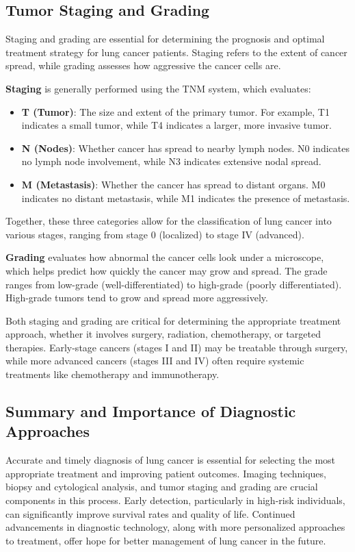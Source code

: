 \subsection{Tumor Staging and Grading}

Staging and grading are essential for determining the prognosis and optimal treatment strategy for 
lung cancer patients. Staging refers to the extent of cancer spread, while grading assesses how 
aggressive the cancer cells are.

\textbf{Staging} is generally performed using the TNM system, which evaluates:

\begin{itemize}
    \item \textbf{T (Tumor)}: The size and extent of the primary tumor. For example, T1 indicates a 
    small tumor, while T4 indicates a larger, more invasive tumor.

    \item \textbf{N (Nodes)}: Whether cancer has spread to nearby lymph nodes. N0 indicates no lymph 
    node involvement, while N3 indicates extensive nodal spread.

    \item \textbf{M (Metastasis)}: Whether the cancer has spread to distant organs. M0 indicates no 
    distant metastasis, while M1 indicates the presence of metastasis.
\end{itemize}

Together, these three categories allow for the classification of lung cancer into various stages, 
ranging from stage 0 (localized) to stage IV (advanced).

\textbf{Grading} evaluates how abnormal the cancer cells look under a microscope, which helps predict 
how quickly the cancer may grow and spread. The grade ranges from low-grade (well-differentiated) 
to high-grade (poorly differentiated). High-grade tumors tend to grow and spread more aggressively.

Both staging and grading are critical for determining the appropriate treatment approach, whether it 
involves surgery, radiation, chemotherapy, or targeted therapies. Early-stage cancers (stages I and 
II) may be treatable through surgery, while more advanced cancers (stages III and IV) often require 
systemic treatments like chemotherapy and immunotherapy.

\subsection{Summary and Importance of Diagnostic Approaches}
Accurate and timely diagnosis of lung cancer is essential for selecting the most appropriate 
treatment and improving patient outcomes. Imaging techniques, biopsy and cytological analysis, and 
tumor staging and grading are crucial components in this process. Early detection, particularly in 
high-risk individuals, can significantly improve survival rates and quality of life. Continued 
advancements in diagnostic technology, along with more personalized approaches to treatment, offer 
hope for better management of lung cancer in the future.